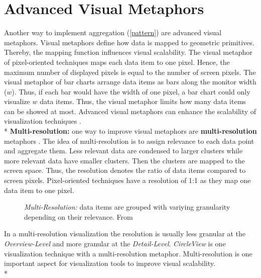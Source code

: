 \section{Advanced Visual Metaphors}\label{advancedmetaphor}
Another way to implement aggregation (\ref{pattern}) are advanced visual metaphors. Visual metaphors define how data is mapped to geometric primitives. Thereby, the mapping function influences visual scalability. The visual metaphor of pixel-oriented techniques maps each data item to one pixel. Hence, the maximum number of displayed pixels is equal to the number of screen pixels. The visual metaphor of bar charts  arrange data items as bars along the monitor width ($w$). Thus, if each bar would have the width of one pixel, a bar chart could only visualize  $w$ data items. Thus, the visual metaphor limits how many data items can be showed at most. Advanced visual metaphors can enhance the scalability of visualization techniques  \cite{Eick2002}. \\*
 \textbf{Multi-resolution:} \label{multi-resolution} one way to improve visual metaphors are \textbf{multi-resolution} metaphors  \cite{Keim2005}. The idea of multi-resolution is to assign relevance to each data point and aggregate them. Less relevant data are condensed to larger clusters while more relevant data have smaller clusters. Then the clusters are mapped to the screen space. Thus, the resolution denotes the ratio of data items compared to screen pixels. Pixel-oriented techniques have a resolution of 1:1 as they map one data item to one pixel. 
 \begin{figure}
     \centering
     \caption{\textit{Multi-Resolution: }data items are grouped with variying granularity depending on their relevance. From  \cite{Keim2005}}
     \label{multi-resolution}
 \end{figure}
 In a multi-resolution visualization the resolution is usually less granular at the \textit{Overview-Level} and more granular at the \textit{Detail-Level}. \textit{CircleView} is one visualization technique with a multi-resolution metaphor. Multi-resolution is one important aspect for visualization tools to improve visual scalability.\\*

